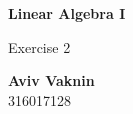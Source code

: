\documentclass[a4paper, 12pt]{article}
\begin{document}
    \begin{center}
        \vspace*{4.4cm}
            
        \Huge
        \textbf{Linear Algebra I}
            
        \vspace{0.5cm}
        \LARGE
        Exercise 2

        \vfill
            
        \Large
        \textbf{Aviv Vaknin}\\316017128
                    
    \end{center}
\end{document}

